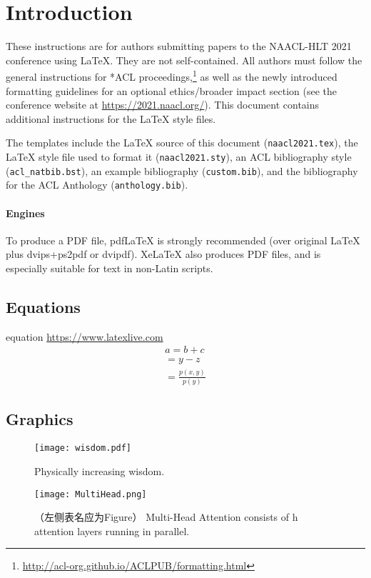\section{Introduction}
\label{sec:intro}


These instructions are for authors submitting papers to the NAACL-HLT 2021 conference using \LaTeX. They are not self-contained. All authors must follow the general instructions for *ACL proceedings,\footnote{\url{http://acl-org.github.io/ACLPUB/formatting.html}} as well as the newly introduced formatting guidelines for an optional ethics/broader impact section (see the conference website at \url{https://2021.naacl.org/}).  This document contains additional instructions for the \LaTeX{} style files.

The templates include the \LaTeX{} source of this document (\texttt{naacl2021.tex}),
the \LaTeX{} style file used to format it (\texttt{naacl2021.sty}),
an ACL bibliography style (\texttt{acl\_natbib.bst}),
an example bibliography (\texttt{custom.bib}),
and the bibliography for the ACL Anthology (\texttt{anthology.bib}).

\paragraph{Engines}

To produce a PDF file, pdf\LaTeX{} is strongly recommended (over original \LaTeX{} plus dvips+ps2pdf or dvipdf). Xe\LaTeX{} also produces PDF files, and is especially suitable for text in non-Latin scripts. 

\subsection{Equations}

equation \url{https://www.latexlive.com}
\begin{eqnarray}
	a  =  b + c \\
	=  y - z \\
	= \frac{p(x,y)}{p(y)}
\end{eqnarray}

 
\subsection{Graphics}

 \begin{figure}[h!]
	\centering	\texttt{[image: wisdom.pdf]}
	\caption{Physically increasing wisdom.}
	\label{fig:wisdom}
\end{figure}

\begin{figure}[htbp]
	\hspace{-40pt}
	\texttt{[image: MultiHead.png]}
	\caption{ （左侧表名应为Figure） Multi-Head Attention consists of h attention layers running in parallel.}
	\label{fig:MultiHead}
\end{figure}





